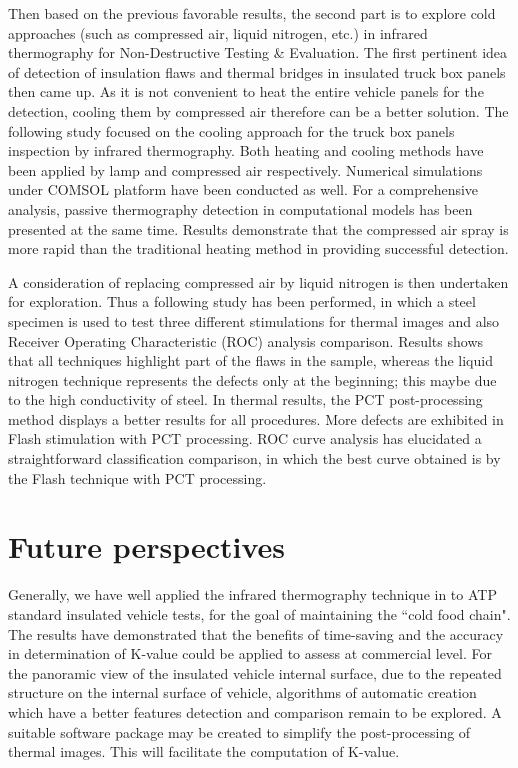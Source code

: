 Then based on the previous favorable results, the second part is to explore cold approaches (such as compressed air, liquid nitrogen, etc.) in infrared thermography for Non-Destructive Testing \& Evaluation. The first pertinent idea of detection of insulation flaws and thermal bridges in insulated truck box panels then came up. As it is not convenient to heat the entire vehicle panels for the detection, cooling them by compressed air therefore can be a better solution. The following study focused on the cooling approach for the truck box panels inspection by infrared thermography. Both heating and cooling methods have been applied by lamp and compressed air respectively. Numerical simulations under COMSOL platform have been conducted as well. For a comprehensive analysis, passive thermography detection in computational models has been presented at the same time. Results demonstrate that the compressed air spray is more rapid than the traditional heating method in providing successful detection.

A consideration of replacing compressed air by liquid nitrogen is then undertaken for exploration. Thus a following study has been performed, in which a steel specimen is used to test three different stimulations for thermal images and also Receiver Operating Characteristic (ROC) analysis comparison. Results shows that all techniques highlight part of the flaws in the sample, whereas the liquid nitrogen technique represents the defects only at the beginning; this maybe due to the high conductivity of steel. In thermal results, the PCT post-processing method displays a better results for all procedures. More defects are exhibited in Flash stimulation with PCT processing. ROC curve analysis has elucidated a straightforward classification comparison, in which the best curve obtained is by the Flash technique with PCT processing. 



\section{Future perspectives}
Generally, we have well applied the infrared thermography technique in to ATP standard insulated vehicle tests, for the goal of maintaining the ``cold food chain". The results have demonstrated that the benefits of time-saving and the accuracy in determination of K-value could be applied to assess at commercial level.  For the panoramic view of the insulated vehicle internal surface, due to the repeated structure on the internal surface of vehicle, algorithms of automatic creation which have a better features detection and comparison remain to be explored.  A suitable software package may be created to simplify the post-processing of thermal images. This will facilitate the computation of K-value.

